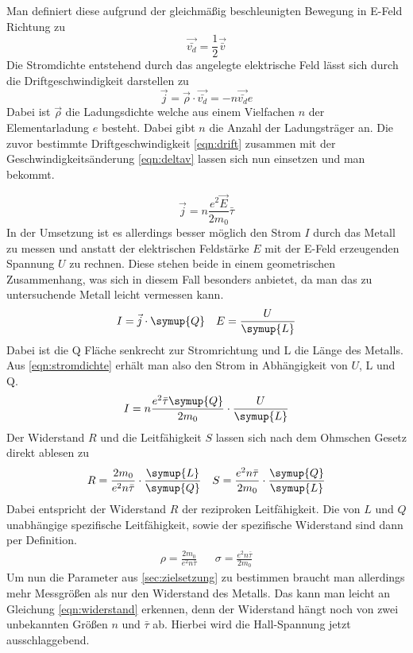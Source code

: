Man definiert diese aufgrund der gleichmäßig beschleunigten Bewegung in E-Feld Richtung zu
\begin{equation}
\label{eqn:drift}
\vec{\bar{v_{d}}} = \frac{1}{2} \vec{\bar{v}}
\end{equation}
Die Stromdichte entstehend durch das angelegte elektrische Feld lässt sich durch die Driftgeschwindigkeit darstellen zu
\begin{equation}
\label{eqn:stromdichteunddrift}
\vec{j} = \vec{\rho} \cdot \vec{\bar{v_{d}}} = - n \vec{\bar{v_{d}}} e
\end{equation}
Dabei ist $\vec{\rho}$ die Ladungsdichte welche aus einem Vielfachen $n$ der Elementarladung $e$ besteht. Dabei gibt $n$ die Anzahl der Ladungsträger an.
Die zuvor bestimmte Driftgeschwindigkeit \eqref{eqn:drift} zusammen mit der Geschwindigkeitsänderung \eqref{eqn:deltav} lassen sich nun einsetzen und man bekommt.

\begin{equation}
\label{eqn:stromdichte}
\vec{j} = n \frac{e^{2}\vec{E}}{2m_{0}} \bar{\tau}
\end{equation}
In der Umsetzung ist es allerdings besser möglich den Strom $I$ durch das Metall zu messen und anstatt der elektrischen Feldstärke $E$ mit der E-Feld erzeugenden Spannung $U$
zu rechnen. Diese stehen beide in einem geometrischen Zusammenhang, was sich in diesem Fall besonders anbietet, da man das zu untersuchende Metall leicht vermessen kann.
\begin{align}
\label{eqn:querschnitt}
I = \vec{j} \cdot \symup{Q} && E = \frac{U}{\symup{L}}
\end{align}
Dabei ist die Q Fläche senkrecht zur Stromrichtung und L die Länge des Metalls.
Aus \eqref{eqn:stromdichte} erhält man also den Strom in Abhängigkeit von $U$, L und Q.
\begin{equation}
\label{eqn:strom}
I = n \frac{e^{2}\bar{\tau} \symup{Q}}{2m_{0}} \cdot \frac{U}{\symup{L}}
\end{equation}
Der Widerstand $R$ und die Leitfähigkeit $S$ lassen sich nach dem Ohmschen Gesetz direkt ablesen zu
\begin{align}
\label{eqn:widerstand}
R = \frac{2m_{0}}{e^{2}n \bar{\tau}} \cdot \frac{\symup{L}}{\symup{Q}} && S = \frac{e^{2}n \bar{\tau}}{2m_{0}} \cdot \frac{\symup{Q}}{\symup{L}}
\end{align}
Dabei entspricht der Widerstand $R$ der reziproken Leitfähigkeit. Die von $L$ und $Q$ unabhängige spezifische Leitfähigkeit, sowie der spezifische Widerstand sind dann per Definition.
\begin{align}
\nonumber
\rho = \frac{2m_{0}}{e^{2}n \bar{\tau}} && \sigma = \frac{e^{2}n \bar{\tau}}{2m_{0}} 
\end{align}
Um nun die Parameter aus \ref{sec:zielsetzung} zu bestimmen braucht man allerdings mehr Messgrößen als nur den Widerstand des Metalls. Das kann man leicht an Gleichung
\eqref{eqn:widerstand} erkennen, denn der Widerstand hängt noch von zwei unbekannten Größen $n$ und $\bar{\tau}$ ab.
Hierbei wird die Hall-Spannung jetzt ausschlaggebend.

